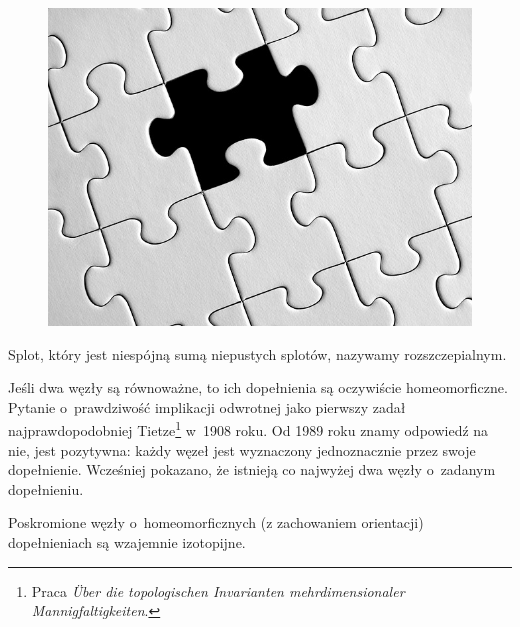 \begin{example}
\begin{figure}[H]
\begin{minipage}[b]{.32\linewidth}
        \end{minipage}
        \begin{minipage}[b]{.32\linewidth}
            \centering
            \includegraphics[width=\linewidth]{../data/missing.jpg}
        \end{minipage}
    \end{figure}
\end{example}

\begin{definition}[rozszczepialność]
    Splot, który jest niespójną sumą niepustych splotów, nazywamy rozszczepialnym.
\end{definition}

Jeśli dwa węzły są równoważne, to ich dopełnienia są oczywiście homeomorficzne.
Pytanie o~prawdziwość implikacji odwrotnej jako pierwszy zadał najprawdopodobniej Tietze\footnote{Praca \emph{Über die topologischen Invarianten mehrdimensionaler Mannigfaltigkeiten}.} w~1908 roku.
Od 1989 roku znamy odpowiedź na nie, jest pozytywna: każdy węzeł jest wyznaczony jednoznacznie przez swoje dopełnienie.
Wcześniej pokazano, że istnieją co najwyżej dwa węzły o~zadanym dopełnieniu.

\begin{theorem} \label{thm_gordon_luecke}
    Poskromione węzły o~homeomorficznych (z zachowaniem orientacji) dopełnieniach są wzajemnie izotopijne.
\end{theorem}

